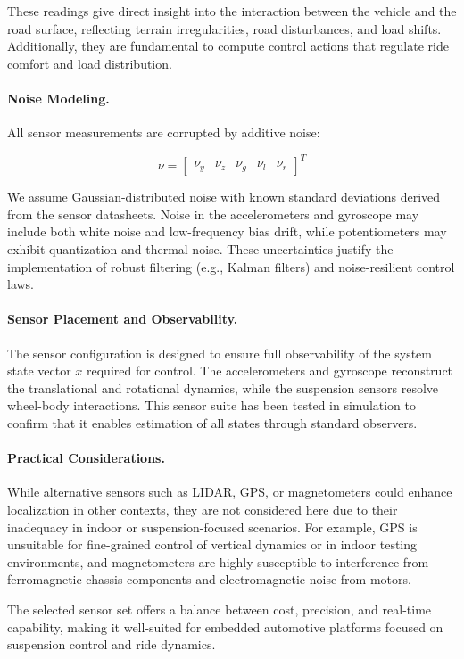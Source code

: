 \documentclass[]{report}
\begin{document}
These readings give direct insight into the interaction between the vehicle and the road surface, reflecting terrain irregularities, road disturbances, and load shifts. Additionally, they are fundamental to compute control actions that regulate ride comfort and load distribution.

\paragraph{Noise Modeling.}
All sensor measurements are corrupted by additive noise:

\[
\nu = \begin{bmatrix}
	\nu_y & \nu_z & \nu_g & \nu_l & \nu_r
\end{bmatrix}^T
\]

We assume Gaussian-distributed noise with known standard deviations derived from the sensor datasheets. Noise in the accelerometers and gyroscope may include both white noise and low-frequency bias drift, while potentiometers may exhibit quantization and thermal noise. These uncertainties justify the implementation of robust filtering (e.g., Kalman filters) and noise-resilient control laws.

\paragraph{Sensor Placement and Observability.}
The sensor configuration is designed to ensure full observability of the system state vector $x$ required for control. The accelerometers and gyroscope reconstruct the translational and rotational dynamics, while the suspension sensors resolve wheel-body interactions. This sensor suite has been tested in simulation to confirm that it enables estimation of all states through standard observers.

\paragraph{Practical Considerations.}
While alternative sensors such as LIDAR, GPS, or magnetometers could enhance localization in other contexts, they are not considered here due to their inadequacy in indoor or suspension-focused scenarios. For example, GPS is unsuitable for fine-grained control of vertical dynamics or in indoor testing environments, and magnetometers are highly susceptible to interference from ferromagnetic chassis components and electromagnetic noise from motors.

The selected sensor set offers a balance between cost, precision, and real-time capability, making it well-suited for embedded automotive platforms focused on suspension control and ride dynamics.
\end{document}
